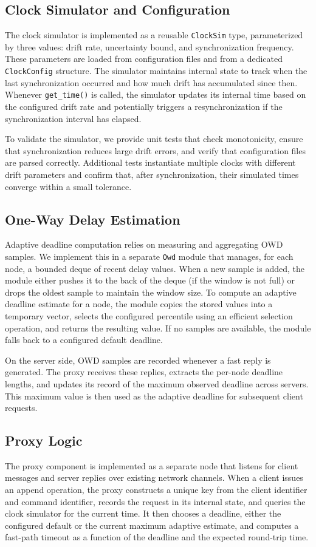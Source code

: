 \documentclass{article}
\begin{document}
\subsection{Clock Simulator and Configuration}
The clock simulator is implemented as a reusable \texttt{ClockSim} type, parameterized by three values: drift rate, uncertainty bound, and synchronization frequency. These parameters are loaded from configuration files and from a dedicated \texttt{ClockConfig} structure. The simulator maintains internal state to track when the last synchronization occurred and how much drift has accumulated since then. Whenever \texttt{get\_time()} is called, the simulator updates its internal time based on the configured drift rate and potentially triggers a resynchronization if the synchronization interval has elapsed.

To validate the simulator, we provide unit tests that check monotonicity, ensure that synchronization reduces large drift errors, and verify that configuration files are parsed correctly. Additional tests instantiate multiple clocks with different drift parameters and confirm that, after synchronization, their simulated times converge within a small tolerance.

\subsection{One-Way Delay Estimation}
Adaptive deadline computation relies on measuring and aggregating OWD samples. We implement this in a separate \texttt{Owd} module that manages, for each node, a bounded deque of recent delay values. When a new sample is added, the module either pushes it to the back of the deque (if the window is not full) or drops the oldest sample to maintain the window size. To compute an adaptive deadline estimate for a node, the module copies the stored values into a temporary vector, selects the configured percentile using an efficient selection operation, and returns the resulting value. If no samples are available, the module falls back to a configured default deadline.

On the server side, OWD samples are recorded whenever a fast reply is generated. The proxy receives these replies, extracts the per-node deadline lengths, and updates its record of the maximum observed deadline across servers. This maximum value is then used as the adaptive deadline for subsequent client requests.

\subsection{Proxy Logic}
The proxy component is implemented as a separate node that listens for client messages and server replies over existing network channels. When a client issues an append operation, the proxy constructs a unique key from the client identifier and command identifier, records the request in its internal state, and queries the clock simulator for the current time. It then chooses a deadline, either the configured default or the current maximum adaptive estimate, and computes a fast-path timeout as a function of the deadline and the expected round-trip time.
\end{document}
